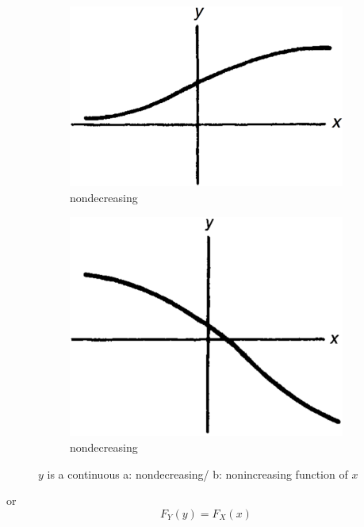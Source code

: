 \begin{figure}
	\begin{subfigure}[b]{.48\textwidth}
		\includegraphics[width=1.\textwidth]{graphics/gi/mc-8}
		\caption{nondecreasing}
	\end{subfigure}
	\begin{subfigure}[b]{.48\textwidth}
		\includegraphics[width=1.\textwidth]{graphics/gi/mc-9}
		\caption{nondecreasing}
	\end{subfigure}
	\caption{$y$ is a continuous a: nondecreasing/ b: nonincreasing function of $x$}
	\label{f:transforming-function}
\end{figure}

or
\begin{equation}\label{e:label123}
	F_Y(y)=F_X(x)
\end{equation}

